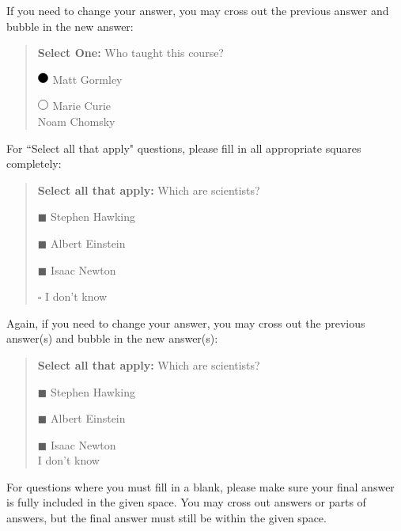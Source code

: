\documentclass[11pt]{article}
\numberwithin{equation}{section} %
\numberwithin{figure}{section} %
\numberwithin{table}{section} %
\newcommand{\blackcircle}{\tikz\draw[black,fill=black] (0,0) circle (1ex);}
\renewcommand{\circle}{\tikz\draw[black] (0,0) circle (1ex);}
\begin{document}
If you need to change your answer, you may cross out the previous answer and bubble in the new answer:

\begin{quote}
\textbf{Select One:} Who taught this course?
\begin{list}{}
     \item $\blackcircle$ Matt Gormley
     \item $\circle$ Marie Curie\\
     \xcancel{$\blackcircle$}{} Noam Chomsky
\end{list}
\end{quote}


For ``Select all that apply" questions, please fill in all appropriate squares completely:

\begin{quote}
\textbf{Select all that apply:} Which are scientists?
    \begin{list}{}
    \item $\blacksquare$ Stephen Hawking 
    \item $\blacksquare$ Albert Einstein
    \item $\blacksquare$ Isaac Newton
    \item $\square$ I don't know
\end{list}
\end{quote}

Again, if you need to change your answer, you may cross out the previous answer(s) and bubble in the new answer(s):

\begin{quote}
\textbf{Select all that apply:} Which are scientists?
    \begin{list}{}
    \item $\blacksquare$ Stephen Hawking 
    \item $\blacksquare$ Albert Einstein
    \item $\blacksquare$ Isaac Newton\\
    \xcancel{$\blacksquare$} I don't know
\end{list}
\end{quote}

For questions where you must fill in a blank, please make sure your final answer is fully included in the given space. You may cross out answers or parts of answers, but the final answer must still be within the given space.
\end{document}
